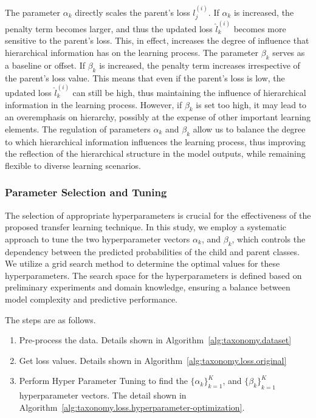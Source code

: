 \documentclass[final,1p,times,authoryear]{elsarticle}
\begin{document}
The parameter $\alpha _k$ directly scales the parent's loss $l_j^{(i)}$. If $\alpha _k$ is increased, the penalty term becomes larger, and thus the updated loss $\widehat{l}_k^{(i)}$ becomes more sensitive to the parent's loss. This, in effect, increases the degree of influence that hierarchical information has on the learning process. The parameter $\beta_k$ serves as a baseline or offset. If $\beta_k$ is increased, the penalty term increases irrespective of the parent's loss value. This means that even if the parent's loss is low, the updated loss $\widehat{l}_k^{(i)}$ can still be high, thus maintaining the influence of hierarchical information in the learning process. However, if $\beta_k$ is set too high, it may lead to an overemphasis on hierarchy, possibly at the expense of other important learning elements. The regulation of parameters $\alpha_k$ and $\beta_k$ allow us to balance the degree to which hierarchical information influences the learning process, thus improving the reflection of the hierarchical structure in the model outputs, while remaining flexible to diverse learning scenarios.

\subsubsection{Parameter Selection and Tuning}
The selection of appropriate hyperparameters is crucial for the effectiveness of the proposed transfer learning technique. In this study, we employ a systematic approach to tune the two hyperparameter vectors $\alpha_k $, and $\beta_k$, which controls the dependency between the predicted probabilities of the child and parent classes. We utilize a grid search method to determine the optimal values for these hyperparameters. The search space for the hyperparameters is defined based on preliminary experiments and domain knowledge, ensuring a balance between model complexity and predictive performance.

The steps are as follows.
\begin{enumerate}
    \item Pre-process the data. Details shown in Algorithm~\ref{alg:taxonomy.dataset}
    \item Get loss values. Details shown in Algorithm~\ref{alg:taxonomy.loss.original}
    \item Perform Hyper Parameter Tuning to find the ${\{\alpha_k \}}_{k=1}^K$, and ${\{\beta_k \}}_{k=1}^K$ hyperparameter vectors. The detail shown in Algorithm~\ref{alg:taxonomy.loss.hyperparameter-optimization}.
\end{enumerate}
\end{document}
